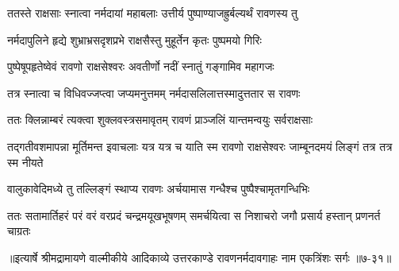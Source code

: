 \twolineshloka
{ततस्ते राक्षसाः स्नात्वा नर्मदायां महाबलाः}
{उत्तीर्य पुष्पाण्याजह्रुर्बल्यर्थं रावणस्य तु} %

\twolineshloka
{नर्मदापुलिने हृद्ये शुभ्राभ्रसदृशप्रभे}
{राक्षसैस्तु मुहूर्तेन कृतः पुष्पमयो गिरिः} %

\twolineshloka
{पुष्पेषूपहृतेष्वेवं रावणो राक्षसेश्वरः}
{अवतीर्णो नदीं स्नातुं गङ्गामिव महागजः} %

\twolineshloka
{तत्र स्नात्वा च विधिवज्जप्त्वा जप्यमनुत्तमम्}
{नर्मदासलिलात्तस्मादुत्ततार स रावणः} %

\twolineshloka
{ततः क्लिन्नाम्बरं त्यक्त्वा शुक्लवस्त्रसमावृतम्}
{रावणं प्राञ्जलिं यान्तमन्वयुः सर्वराक्षसाः} %

\threelineshloka
{तद्गतीवशमापन्ना मूर्तिमन्त इवाचलाः}
{यत्र यत्र च याति स्म रावणो राक्षसेश्वरः}
{जाम्बूनदमयं लिङ्गं तत्र तत्र स्म नीयते} %

\twolineshloka
{वालुकावेदिमध्ये तु तल्लिङ्गं स्थाप्य रावणः}
{अर्चयामास गन्धैश्च पुष्पैश्चामृतगन्धिभिः} %

\twolineshloka
{ततः सतामार्तिहरं परं वरं वरप्रदं चन्द्रमयूखभूषणम्}
{समर्चयित्वा स निशाचरो जगौ प्रसार्य हस्तान् प्रणनर्त चाग्रतः} %


॥इत्यार्षे श्रीमद्रामायणे वाल्मीकीये आदिकाव्ये उत्तरकाण्डे रावणनर्मदावगाहः नाम एकत्रिंशः सर्गः ॥७-३१॥
